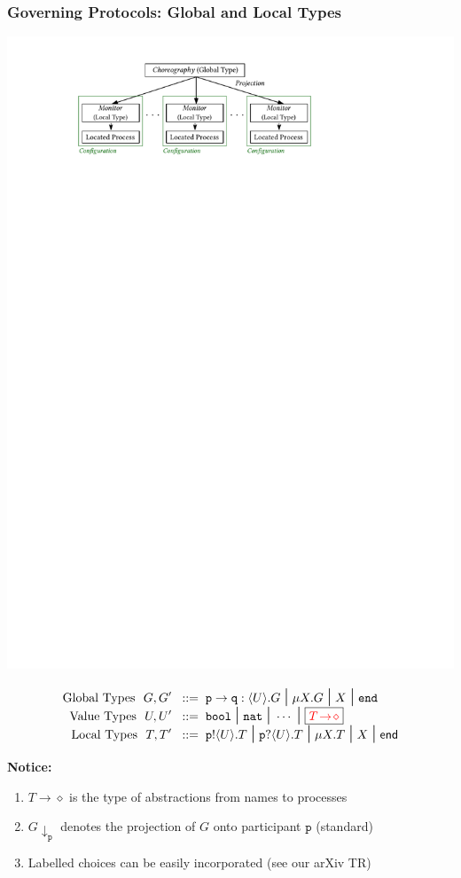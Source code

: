 \documentclass[12pt]{beamer}
\newcommand{\sessionfont}[1]{\mathtt{#1}}
\newcommand{\sharedop}{\rightarrow}
\newcommand{\sred}[1]{\textcolor{myred}{#1}}
\newcommand{\bi}{\begin{enumerate}[$\bullet$]}
\newcommand{\ei}{\end{enumerate}}
\newcommand{\bool}{\sessionfont{bool}}
\newcommand{\nat}{\sessionfont{nat}}
\newcommand{\gtcom}[4]{\gpart{#1}\to\gpart{#2}:\langle #3\rangle.#4}
\newcommand{\gend}{\mathtt{end}}
\newcommand{\lend}{\mathsf{end}}
\newcommand{\gpart}[1]{\mathtt{#1}}
\newcommand{\bnfis}{\;\;::=\;\;}
\def\sbnfbar{\;\mbox{\Large{$\mid$}}\;}
\newcommand{\shot}[1]{#1\! \sharedop\! \diamond}
\newcommand{\ltout}[3]{\gpart{#1}!\langle#2\rangle.#3}
\newcommand{\ltinp}[3]{\gpart{#1}?\langle#2\rangle.#3}
\newcommand{\tproj}[2]{#1\!\downarrow_{#2}}
\newcommand{\p}{\ensuremath{\mathtt{p}}\xspace}
\newcommand{\rtsyn}[1]{\fcolorbox{black}{white}{\ensuremath{#1}}}
\begin{document}
\begin{frame}
\frametitle{Governing Protocols: Global and Local Types}
\begin{center}
\includegraphics[scale=0.7]{figmodel}
\end{center}

\vspace{-8mm}
\begin{align*}
		\text{Global Types}~~	G, G'  \bnfis & \gtcom{p}{q}{U}{G} %
			\sbnfbar %
			\mu X. G \sbnfbar X \sbnfbar \gend \\[-2.5mm]
		\text{Value Types}~~	U, U'  \bnfis & \bool \sbnfbar \nat \sbnfbar \cdots %
			\sbnfbar \sred{\rtsyn{\shot{T}}} \\[-2.5mm]
	    \text{Local Types}~~	T, T'  \bnfis & \ltout{p}{U}{T} \sbnfbar \ltinp{p}{U}{T} %
		  \sbnfbar %
		 \mu X. T \sbnfbar X \sbnfbar \lend 
\end{align*}

\bigskip
\textbf{Notice:}
\bi
\item $\shot{T}$ is the type of abstractions from names to processes
\item $\tproj{G}{\p}$ denotes the projection of $G$ onto participant $\p$ (standard)
\item Labelled choices can be easily incorporated (see our arXiv TR)
\ei
\end{frame}
\end{document}
